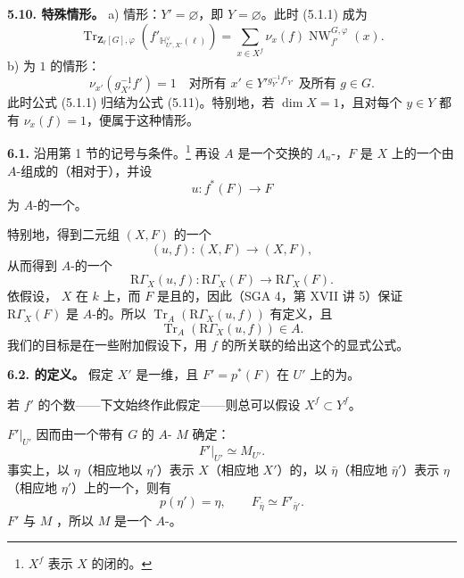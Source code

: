 \textbf{5.10. 特殊情形。}
\textup{a)} 情形：$Y'=\varnothing$，即 $Y=\varnothing$。此时 (5.1.1) 成为
\[
\operatorname{Tr}_{\mathbf Z_\ell[G],\varphi}
 (f'_{\mathbb H_{U',X'}^\vee(\ell)})
=\sum_{x\in X^f}\nu_x(f)\operatorname{NW}_{f'}^{G,\varphi}(x).
\tag{5.11}
\]
\textup{b)} 为 $1$ 的情形：
\[
\nu_{x'}(g_{X'}^{-1}f')=1
\quad\text{对所有 }x'\in Y'{}^{g_{Y'}^{-1}f'_{Y'}}\text{ 及所有 }g\in G.
\]
此时公式 (5.1.1) 归结为公式 (5.11)。特别地，若
$\dim X=1$，且对每个 $y\in Y$ 都有 $\nu_x(f)=1$，便属于这种情形。

\textbf{6.1.} 沿用第 1 节的记号与条件。\footnote{$X^f$ 表示 $X$ 的闭的。}
再设 $A$ 是一个交换的  $\Lambda_n$-，$F$ 是 $X$ 上的一个由 $A$-组成的（相对于），并设
\[
u:f^*(F)\longrightarrow F
\]
为 $A$-的一个。

特别地，得到二元组 $(X,F)$ 的一个
\[
(u,f):(X,F)\longrightarrow(X,F),
\]
从而得到 $A$-的一个
\[
\mathrm R\Gamma_X(u,f):\mathrm R\Gamma_X(F)\longrightarrow\mathrm R\Gamma_X(F).
\]
依假设， $X$ 在 $k$ 上，而 $F$ 是且的，因此（SGA 4，第 XVII 讲 5）保证 $\mathrm R\Gamma_X(F)$ 是 $A$-的。所以
$\operatorname{Tr}_A(\mathrm R\Gamma_X(u,f))$ 有定义，且
\[
\operatorname{Tr}_A(\mathrm R\Gamma_X(u,f))\in A.
\]
我们的目标是在一些附加假设下，用 $f$ 的所关联的给出这个的显式公式。

\textbf{6.2. 的定义。}
假定 $X'$ 是一维，且 $F'=p^*(F)$ 在 $U'$ 上的为。

若 $f'$ 的个数——下文始终作此假定——则总可以假设 $X^f\subset Y^f$。

 $F'|_{U'}$ 因而由一个带有 $G$ 的 $A$- $M$ 确定：
\[
F'|_{U'}\simeq M_{U'}.
\]
事实上，以 $\eta$（相应地以 $\eta'$）表示 $X$（相应地 $X'$）的，以 $\bar\eta$（相应地 $\bar\eta'$）表示 $\eta$（相应地 $\eta'$）上的一个，则有
\[
p(\eta')=\eta,\qquad F_{\bar\eta}\simeq F'_{\bar\eta'}.
\]
 $F'$ 与 $M$ ，所以 $M$ 是一个 $A$-。


